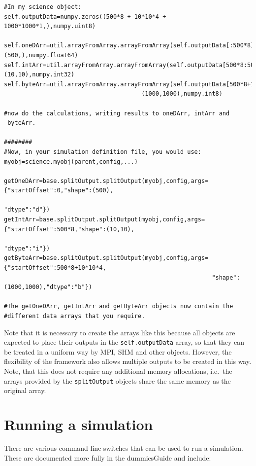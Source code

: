 \documentclass{article}
\begin{document}
\begin{verbatim}
#In my science object:
self.outputData=numpy.zeros((500*8 + 10*10*4 + 1000*1000*1,),numpy.uint8)

self.oneDArr=util.arrayFromArray.arrayFromArray(self.outputData[:500*8],(500,),numpy.float64)
self.intArr=util.arrayFromArray.arrayFromArray(self.outputData[500*8:500*8+10*10*4],(10,10),numpy.int32)
self.byteArr=util.arrayFromArray.arrayFromArray(self.outputData[500*8+10*10*4:500*8+10*10*4+1000*1000],
                                       (1000,1000),numpy.int8)

#now do the calculations, writing results to oneDArr, intArr and
 byteArr.

########
#Now, in your simulation definition file, you would use:
myobj=science.myobj(parent,config,...)

getOneDArr=base.splitOutput.splitOutput(myobj,config,args={"startOffset":0,"shape":(500),
                                                           "dtype":"d"})
getIntArr=base.splitOutput.splitOutput(myobj,config,args={"startOffset":500*8,"shape":(10,10),
                                                           "dtype":"i"})
getByteArr=base.splitOutput.splitOutput(myobj,config,args={"startOffset":500*8+10*10*4,
                                                           "shape":(1000,1000),"dtype":"b"})

#The getOneDArr, getIntArr and getByteArr objects now contain the
#different data arrays that you require.
\end{verbatim}

Note that it is necessary to create the arrays like this because all
objects are expected to place their outputs in the
\texttt{self.outputData} array, so that they can be treated in a
uniform way by MPI, SHM and other objects.  However, the flexibility
of the framework also allows multiple outputs to be created in this
way.  Note, that this does not require any additional memory
allocations, i.e.\ the arrays provided by the \texttt{splitOutput}
objects share the same memory as the original array.

\section{Running a simulation}
There are various command line switches that can be used to run a
simulation.  These are documented more fully in the dummiesGuide and include:
\end{document}

